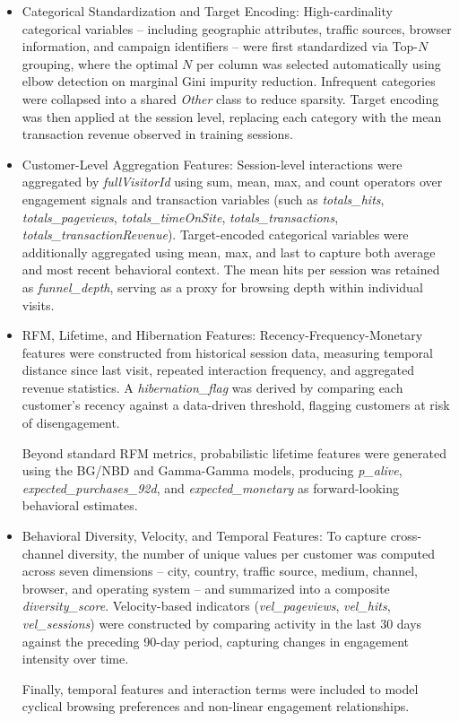\documentclass[conference]{IEEEtran}
\begin{document}
\begin{itemize}

\item Categorical Standardization and Target Encoding: High-cardinality categorical variables -- including geographic
attributes, traffic sources, browser information, and campaign
identifiers -- were first standardized via Top-$N$ grouping,
where the optimal $N$ per column was selected automatically
using elbow detection on marginal Gini impurity reduction.
Infrequent categories were collapsed into a shared
\textit{Other} class to reduce sparsity. Target encoding was
then applied at the session level, replacing each category
with the mean transaction revenue observed in training
sessions.

\item Customer-Level Aggregation Features: Session-level interactions were aggregated by
\textit{fullVisitorId} using sum, mean, max, and count
operators over engagement signals and transaction variables
(such as \textit{totals\_hits},
\textit{totals\_pageviews},
\textit{totals\_timeOnSite},
\textit{totals\_transactions},
\textit{totals\_transactionRevenue}).
Target-encoded categorical variables were additionally
aggregated using mean, max, and last to capture both average
and most recent behavioral context. The mean hits per session
was retained as \textit{funnel\_depth}, serving as a proxy
for browsing depth within individual visits.

\item RFM, Lifetime, and Hibernation Features: Recency-Frequency-Monetary features were constructed from
historical session data, measuring temporal distance since
last visit, repeated interaction frequency, and aggregated
revenue statistics. A \textit{hibernation\_flag} was derived
by comparing each customer's recency against a data-driven
threshold, flagging customers at risk of disengagement.

Beyond standard RFM metrics, probabilistic lifetime features
were generated using the BG/NBD and Gamma-Gamma models,
producing \textit{p\_alive},
\textit{expected\_purchases\_92d}, and
\textit{expected\_monetary} as forward-looking behavioral
estimates.

\item Behavioral Diversity, Velocity, and Temporal Features: To capture cross-channel diversity, the number of unique
values per customer was computed across seven dimensions --
city, country, traffic source, medium, channel, browser, and
operating system -- and summarized into a composite
\textit{diversity\_score}. Velocity-based indicators
(\textit{vel\_pageviews},
\textit{vel\_hits},
\textit{vel\_sessions})
were constructed by comparing activity in the last 30 days
against the preceding 90-day period, capturing changes in
engagement intensity over time.

Finally, temporal features
and interaction terms were included to model cyclical browsing preferences and
non-linear engagement relationships.

\end{itemize}
\end{document}
